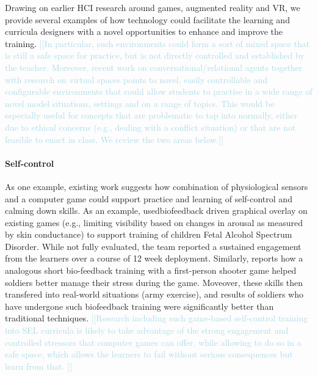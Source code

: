 \documentclass[prodmode,acmtochi]{acmsmall}
\newcommand{\todo}[1]{\textrm{\textrm{\textcolor{LightBlue}{[[#1]]} } } }
\begin{document}
Drawing on earlier HCI research around games, augmented reality and VR, we provide several examples of how technology could facilitate the learning and curricula designers with a novel opportunities to enhance and improve the training. \todo{In particular, such environments could form a sort of mixed space that is still a safe space for practice, but is not directly controlled and established by the teacher. Moreover, recent work on conversational/relational agents together with research on virtual spaces  points to novel, easily controllable and configurable environments that could allow students to practise in a wide range of novel model situations, settings and on a range of topics. This would be especially useful for concepts that are problematic to tap into normally, either due to ethical concerns (e.g., dealing with a conflict situation) or that are not feasible to enact in class. We review the two areas below.}

\paragraph{Self-control} As one example, existing work suggests how combination of physiological sensors and a computer game could support practice and learning of self-control and calming down skills. As an example,  usedbiofeedback driven graphical overlay on existing games (e.g., limiting visibility based on changes in arousal as measured by skin conductance) to support training of children Fetal Alcohol Spectrum Disorder. While not fully evaluated, the team reported a sustained engagement from the learners over a course of 12 week deployment. Similarly,  reports how a analogous short bio-feedback training with a first-person shooter game helped soldiers better manage their stress during the game. Moveover, these skills then transfered into real-world situations (army exercise), and results of soldiers who have undergone such biofeedback training were significantly better than traditional techniques. \todo{Research including such game-based self-control training into SEL curricula is likely to take advantage of the strong engagement and controlled stressors that computer games can offer, while allowing to do so in a safe space, which allows the learners to fail without serious consequences but learn from that. } 
\end{document}
